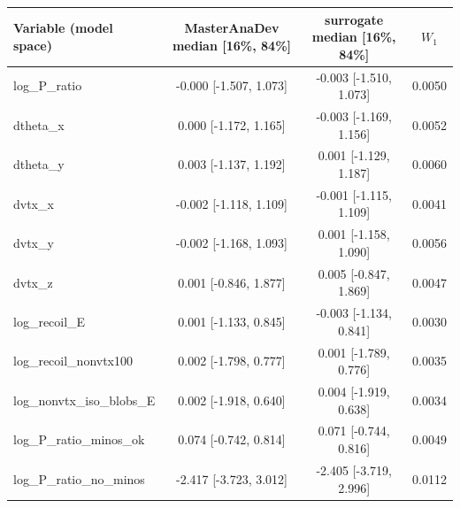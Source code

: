 \begin{tabular}{lccc}
\toprule
Variable (model space) & MasterAnaDev median [16\%, 84\%] & surrogate median [16\%, 84\%] & $W_1$ \\
\midrule
log\_P\_ratio & -0.000 [-1.507, 1.073] & -0.003 [-1.510, 1.073] & 0.0050 \\
dtheta\_x & 0.000 [-1.172, 1.165] & -0.003 [-1.169, 1.156] & 0.0052 \\
dtheta\_y & 0.003 [-1.137, 1.192] & 0.001 [-1.129, 1.187] & 0.0060 \\
dvtx\_x & -0.002 [-1.118, 1.109] & -0.001 [-1.115, 1.109] & 0.0041 \\
dvtx\_y & -0.002 [-1.168, 1.093] & 0.001 [-1.158, 1.090] & 0.0056 \\
dvtx\_z & 0.001 [-0.846, 1.877] & 0.005 [-0.847, 1.869] & 0.0047 \\
log\_recoil\_E & 0.001 [-1.133, 0.845] & -0.003 [-1.134, 0.841] & 0.0030 \\
log\_recoil\_nonvtx100 & 0.002 [-1.798, 0.777] & 0.001 [-1.789, 0.776] & 0.0035 \\
log\_nonvtx\_iso\_blobs\_E & 0.002 [-1.918, 0.640] & 0.004 [-1.919, 0.638] & 0.0034 \\
log\_P\_ratio\_minos\_ok & 0.074 [-0.742, 0.814] & 0.071 [-0.744, 0.816] & 0.0049 \\
log\_P\_ratio\_no\_minos & -2.417 [-3.723, 3.012] & -2.405 [-3.719, 2.996] & 0.0112 \\
\bottomrule
\end{tabular}
